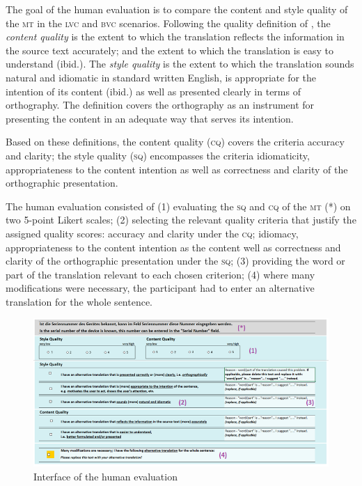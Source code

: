 \documentclass[output=paper]{langsci/langscibook}
\begin{document}
The goal of the human evaluation is to compare the content and style quality of the \textsc{mt} in the \textsc{lvc} and \textsc{bvc} scenarios. Following the quality definition of \citet{Hutchins1992}, the \textit{content quality} is the extent to which the translation reflects the information in the source text accurately; and the extent to which the translation is easy to understand (ibid.). The \textit{style quality} is the extent to which the translation sounds natural and idiomatic in standard written English, is appropriate for the intention of its content (ibid.) as well as presented clearly in terms of orthography. The definition covers the orthography as an instrument for presenting the content in an adequate way that serves its intention. 

Based on these definitions, the content quality (\textsc{cq}) covers the criteria accuracy and clarity; the style quality (\textsc{sq}) encompasses the criteria idiomaticity, appropriateness to the content intention as well as correctness and clarity of the orthographic presentation. 

The human evaluation  consisted of
(1) evaluating the \textsc{sq} and \textsc{cq} of the \textsc{mt} (*) on two 5-point Likert scales;
(2) selecting the relevant quality criteria that justify the assigned quality scores: accuracy and clarity under the \textsc{cq}; idiomacy, appropriateness to the content intention as the content well as correctness and clarity of the orthographic presentation under the \textsc{sq};
(3) providing the word or part of the translation relevant to each chosen criterion; (4) where many modifications were necessary, the participant had to enter an alternative translation for the whole sentence.\largerpage[2]


\begin{figure}
	\includegraphics[width=\textwidth]{figures/figure1.png}
    \caption{Interface of the human evaluation}
    \label{marzouk:fig1}
\end{figure}
\end{document}
